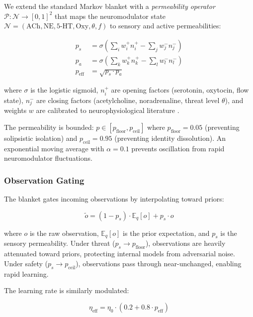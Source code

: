 We extend the standard Markov blanket with a \emph{permeability operator}
$\mathcal{P}: \mathcal{N} \to [0, 1]^2$ that maps the neuromodulator state
$\mathcal{N} = (\text{ACh}, \text{NE}, \text{5-HT}, \text{Oxy}, \theta, f)$
to sensory and active permeabilities:

\begin{align}
    p_s &= \sigma\left(\sum_i w_i^+ n_i^+ - \sum_j w_j^- n_j^-\right) \label{eq:sensory-perm} \\
    p_a &= \sigma\left(\sum_k w_k^+ n_k^+ - \sum_l w_l^- n_l^-\right) \label{eq:active-perm} \\
    p_{\text{eff}} &= \sqrt{p_s \cdot p_a} \label{eq:effective-perm}
\end{align}

where $\sigma$ is the logistic sigmoid, $n_i^+$ are opening factors (serotonin,
oxytocin, flow state), $n_j^-$ are closing factors (acetylcholine, noradrenaline,
threat level $\theta$), and weights $w$ are calibrated to neurophysiological
literature \citep{yu2005uncertainty, aston-jones2005integrative, dayan2009serotonin}.

The permeability is bounded: $p \in [p_{\text{floor}}, p_{\text{ceil}}]$ where
$p_{\text{floor}} = 0.05$ (preventing solipsistic isolation) and
$p_{\text{ceil}} = 0.95$ (preventing identity dissolution). An exponential moving
average with $\alpha = 0.1$ prevents oscillation from rapid neuromodulator fluctuations.

\subsubsection{Observation Gating}

The blanket gates incoming observations by interpolating toward priors:

\begin{equation}
    \tilde{o} = (1 - p_s) \cdot \mathbb{E}_q[o] + p_s \cdot o \label{eq:gating}
\end{equation}

where $o$ is the raw observation, $\mathbb{E}_q[o]$ is the prior expectation, and
$p_s$ is the sensory permeability. Under threat ($p_s \to p_{\text{floor}}$),
observations are heavily attenuated toward priors, protecting internal models from
adversarial noise. Under safety ($p_s \to p_{\text{ceil}}$), observations pass
through near-unchanged, enabling rapid learning.

The learning rate is similarly modulated:

\begin{equation}
    \eta_{\text{eff}} = \eta_0 \cdot (0.2 + 0.8 \cdot p_{\text{eff}}) \label{eq:lr-mod}
\end{equation}

